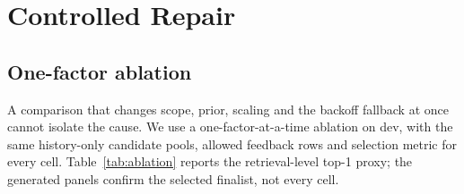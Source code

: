 \section{Controlled Repair}
\label{sec:repair}

\subsection{One-factor ablation}
A comparison that changes scope, prior, scaling and the backoff fallback at once
cannot isolate the cause. We use a one-factor-at-a-time ablation on dev, with the
same history-only candidate pools, allowed feedback rows and selection metric for
every cell. Table~\ref{tab:ablation} reports the retrieval-level top-1 proxy; the
generated panels confirm the selected finalist, not every cell.

